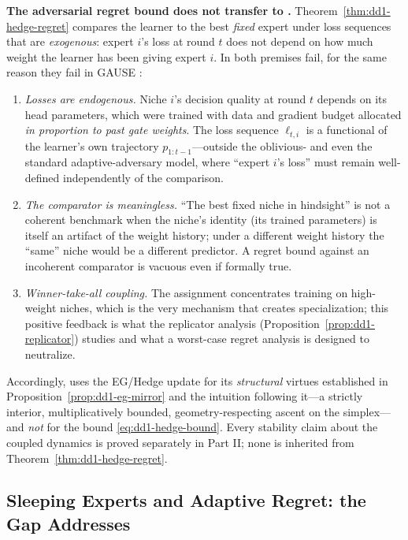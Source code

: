 \begin{warning}
\textbf{The adversarial regret bound does not transfer to \nm{}.}
Theorem~\ref{thm:dd1-hedge-regret} compares the learner to the best
\emph{fixed} expert under loss sequences that are \emph{exogenous}: expert
$i$'s loss at round $t$ does not depend on how much weight the learner has
been giving expert $i$. In \nm{} both premises fail, for the same reason they
fail in GAUSE \cite{li2026gause}:
\begin{enumerate}
\item \emph{Losses are endogenous.} Niche $i$'s decision quality at round $t$
depends on its head parameters, which were trained with data and gradient
budget allocated \emph{in proportion to past gate weights}. The loss sequence
$\ell_{t,i}$ is a functional of the learner's own trajectory
$p_{1:t-1}$---outside the oblivious- and even the standard adaptive-adversary
model, where ``expert $i$'s loss'' must remain well-defined independently of
the comparison.
\item \emph{The comparator is meaningless.} ``The best fixed niche in
hindsight'' is not a coherent benchmark when the niche's identity (its
trained parameters) is itself an artifact of the weight history; under a
different weight history the ``same'' niche would be a different predictor.
A regret bound against an incoherent comparator is vacuous even if formally
true.
\item \emph{Winner-take-all coupling.} The \nm{} assignment concentrates
training on high-weight niches, which is the very mechanism that creates
specialization; this positive feedback is what the replicator analysis
(Proposition~\ref{prop:dd1-replicator}) studies and what a worst-case regret
analysis is designed to neutralize.
\end{enumerate}
Accordingly, \nm{} uses the EG/Hedge update for its \emph{structural}
virtues established in Proposition~\ref{prop:dd1-eg-mirror} and the
intuition following it---a strictly interior, multiplicatively bounded,
geometry-respecting ascent on the simplex---and \emph{not} for the bound
\eqref{eq:dd1-hedge-bound}. Every stability claim about the coupled dynamics
is proved separately in Part II; none is inherited from
Theorem~\ref{thm:dd1-hedge-regret}.
\end{warning}

\subsection{Sleeping Experts and Adaptive Regret: the Gap \nm{} Addresses}
\label{sec:dd1-sleeping}

